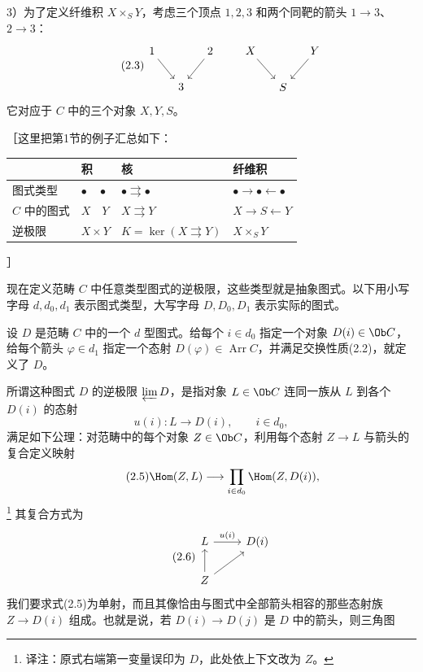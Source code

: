 3）为了定义纤维积 $X\times_S Y$，考虑三个顶点 $1,2,3$ 和两个同靶的箭头 $1\to3$、$2\to3$：
\begin{equation}\tag{2.3}
\begin{tikzcd}[column sep=small,ampersand replacement=\&]
1\arrow[dr]\&\&2\arrow[dl]\\\&3\&
\end{tikzcd}
\qquad
\begin{tikzcd}[column sep=small,ampersand replacement=\&]
X\arrow[dr]\&\&Y\arrow[dl]\\\&S\&
\end{tikzcd}
\end{equation}
它对应于 $C$ 中的三个对象 $X,Y,S$。

［这里把第1节的例子汇总如下：
\begin{center}
\begin{tabular}{llll}
\toprule
 &积&核&纤维积\\
\midrule
图式类型 &$\bullet\quad\bullet$ &$\bullet\rightrightarrows\bullet$ &$\bullet\to\bullet\leftarrow\bullet$\\
$C$ 中的图式 &$X\quad Y$ &$X\rightrightarrows Y$ &$X\to S\leftarrow Y$\\
逆极限 &$X\times Y$ &$K=\ker(X\rightrightarrows Y)$ &$X\times_S Y$\\
\bottomrule
\end{tabular}
\end{center}
］

现在定义范畴 $C$ 中任意类型图式的逆极限，这些类型就是抽象图式。以下用小写字母 $d,d_0,d_1$ 表示图式类型，大写字母 $D,D_0,D_1$ 表示实际的图式。

设 $D$ 是范畴 $C$ 中的一个 $d$ 型图式。给每个 $i\in d_0$ 指定一个对象 $D(i)\in\Ob C$，给每个箭头 $\varphi\in d_1$ 指定一个态射 $D(\varphi)\in\operatorname{Arr}C$，并满足交换性质(2.2)，就定义了 $D$。

所谓这种图式 $D$ 的逆极限 $\varprojlim D$，是指对象 $L\in\Ob C$ 连同一族从 $L$ 到各个 $D(i)$ 的态射
\begin{equation}\tag{2.4}
 u(i):L\longrightarrow D(i),\qquad i\in d_0,
\end{equation}
满足如下公理：对范畴中的每个对象 $Z\in\Ob C$，利用每个态射 $Z\to L$ 与箭头的复合定义映射
\begin{equation}\tag{2.5}
 \Hom(Z,L)\longrightarrow\prod_{i\in d_0}\Hom(Z,D(i)),
\end{equation}
\footnote{译注：原式右端第一变量误印为 $D$，此处依上下文改为 $Z$。}
其复合方式为
\begin{equation}\tag{2.6}
\begin{tikzcd}[ampersand replacement=\&]
 L\arrow[r,"u(i)"]\&D(i)\\Z\arrow[u]\arrow[ur]\&
\end{tikzcd}
\end{equation}
我们要求式(2.5)为单射，而且其像恰由与图式中全部箭头相容的那些态射族 $Z\to D(i)$ 组成。也就是说，若 $D(i)\to D(j)$ 是 $D$ 中的箭头，则三角图

